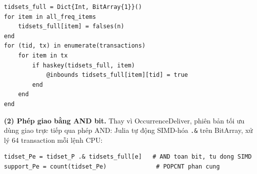 \documentclass[12pt,a4paper]{article}
\theoremstyle{definition}
\begin{document}
\begin{lstlisting}[caption={Xây dựng tidset BitArray chỉ cho mục phổ biến (Tối ưu)}, label=lst:build_tidset]
tidsets_full = Dict{Int, BitArray{1}}()
for item in all_freq_items
    tidsets_full[item] = falses(n)
end
for (tid, tx) in enumerate(transactions)
    for item in tx
        if haskey(tidsets_full, item)
            @inbounds tidsets_full[item][tid] = true
        end
    end
end
\end{lstlisting}

\textbf{(2) Phép giao bằng AND bit.} Thay vì OccurrenceDeliver, phiên bản tối ưu dùng giao trực tiếp qua phép AND: Julia tự động SIMD-hóa \texttt{.\&} trên BitArray, xử lý 64 transaction mỗi lệnh CPU:

\begin{lstlisting}[caption={Giao tidset bằng AND bit và đếm support bằng POPCNT (Tối ưu)}, label=lst:bitarray_intersect]
tidset_Pe = tidset_P .& tidsets_full[e]   # AND toan bit, tu dong SIMD
support_Pe = count(tidset_Pe)              # POPCNT phan cung
\end{lstlisting}
\end{document}
